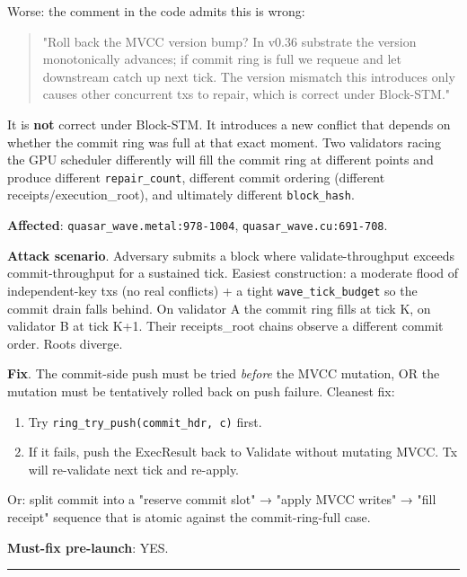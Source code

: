 \documentclass[
]{article}
\providecommand{\tightlist}{%
  \setlength{\itemsep}{0pt}\setlength{\parskip}{0pt}}
\begin{document}
Worse: the comment in the code admits this is wrong:

\begin{quote}
"Roll back the MVCC version bump? In v0.36 substrate the version
monotonically advances; if commit ring is full we requeue and let
downstream catch up next tick. The version mismatch this introduces only
causes other concurrent txs to repair, which is correct under
Block-STM."
\end{quote}

It is \textbf{not} correct under Block-STM. It introduces a new conflict
that depends on whether the commit ring was full at that exact moment.
Two validators racing the GPU scheduler differently will fill the commit
ring at different points and produce different \texttt{repair\_count},
different commit ordering (different receipts/execution\_root), and
ultimately different \texttt{block\_hash}.

\textbf{Affected}: \texttt{quasar\_wave.metal:978-1004},
\texttt{quasar\_wave.cu:691-708}.

\textbf{Attack scenario}. Adversary submits a block where
validate-throughput exceeds commit-throughput for a sustained tick.
Easiest construction: a moderate flood of independent-key txs (no real
conflicts) + a tight \texttt{wave\_tick\_budget} so the commit drain
falls behind. On validator A the commit ring fills at tick K, on
validator B at tick K+1. Their receipts\_root chains observe a different
commit order. Roots diverge.

\textbf{Fix}. The commit-side push must be tried \emph{before} the MVCC
mutation, OR the mutation must be tentatively rolled back on push
failure. Cleanest fix:

\begin{enumerate}
\def\labelenumi{\arabic{enumi}.}
\tightlist
\item
  Try \texttt{ring\_try\_push(commit\_hdr,\ c)} first.
\item
  If it fails, push the ExecResult back to Validate without mutating
  MVCC. Tx will re-validate next tick and re-apply.
\end{enumerate}

Or: split commit into a "reserve commit slot" → "apply MVCC writes" →
"fill receipt" sequence that is atomic against the commit-ring-full
case.

\textbf{Must-fix pre-launch}: YES.

\begin{center}\rule{0.5\linewidth}{0.5pt}\end{center}
\end{document}
